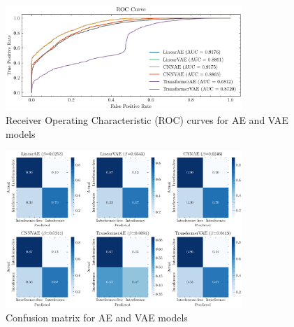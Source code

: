 \documentclass[12pt]{article}
\begin{document}
\begin{figure}
    \centering
    \includegraphics[width=0.8\textwidth]{roc.pdf}
    \caption{Receiver Operating Characteristic (ROC) curves for AE and VAE models}
    \label{fig:roc}
\end{figure}


\begin{figure}[htbp]
    \centering
    \includegraphics[width=0.8\textwidth]{confusion.pdf}
    \caption{Confusion matrix for AE and VAE models}
    \label{fig:prc}
    
\end{figure}
\end{document}
